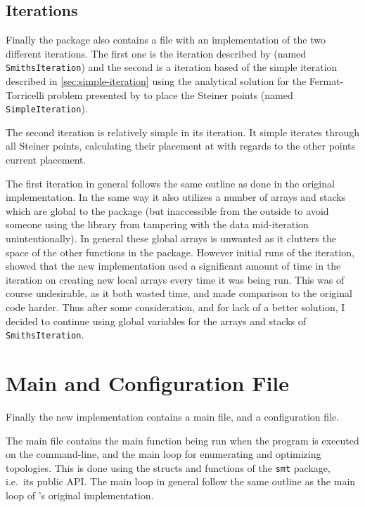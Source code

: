 \subsection{Iterations}
\label{sec:iterations-1}

Finally the package also contains a file with an implementation of the two
different iterations. The first one is the iteration described by
\textcite{smith1992} (named \texttt{SmithsIteration}) and the second is a
iteration based of the simple iteration described in \cref{sec:simple-iteration}
using the analytical solution for the Fermat-Torricelli problem presented by
\textcite{uteshev2014} to place the Steiner points (named \texttt{SimpleIteration}).

The second iteration is relatively simple in its iteration. It simple iterates
through all Steiner points, calculating their placement at with regards to the
other points current placement.

The first iteration in general follows the same outline as done in the original
implementation. In the same way it also utilizes a number of arrays and stacks
which are global to the package (but inaccessible from the outside to avoid
someone using the library from tampering with the data mid-iteration
unintentionally). In general these global arrays is unwanted as it clutters the
space of the other functions in the package. However initial runs of the
iteration, showed that the new implementation used a significant amount of time
in the iteration on creating new local arrays every time it was being run. This
was of course undesirable, as it both wasted time, and made comparison to the
original code harder. Thus after some consideration, and for lack of a better
solution, I decided to continue using global variables for the arrays and stacks
of \texttt{SmithsIteration}.

\section{Main and Configuration File}
\label{sec:main-file}

Finally the new implementation contains a main file, and a configuration file.

The main file contains the main function being run when the program is executed
on the command-line, and the main loop for enumerating and optimizing
topologies. This is done using the structs and functions of the \texttt{smt}
package, i.e.\ its public API. The main loop in general follow the same outline
as the main loop of \citeauthor{smith1992}'s original implementation.

